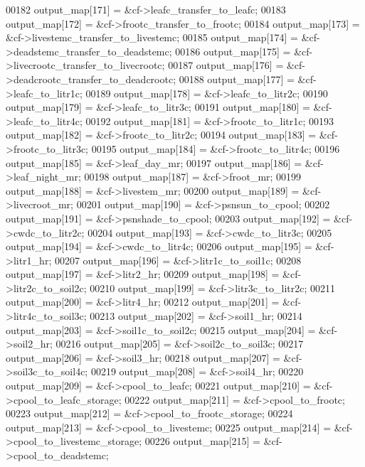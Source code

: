 \begin{DoxyCode}
00182         output\_map[171] = &cf->leafc\_transfer\_to\_leafc;
00183         output\_map[172] = &cf->frootc\_transfer\_to\_frootc;
00184         output\_map[173] = &cf->livestemc\_transfer\_to\_livestemc;
00185         output\_map[174] = &cf->deadstemc\_transfer\_to\_deadstemc;
00186         output\_map[175] = &cf->livecrootc\_transfer\_to\_livecrootc;
00187         output\_map[176] = &cf->deadcrootc\_transfer\_to\_deadcrootc;
00188         output\_map[177] = &cf->leafc\_to\_litr1c;
00189         output\_map[178] = &cf->leafc\_to\_litr2c;
00190         output\_map[179] = &cf->leafc\_to\_litr3c;
00191         output\_map[180] = &cf->leafc\_to\_litr4c;
00192         output\_map[181] = &cf->frootc\_to\_litr1c;
00193         output\_map[182] = &cf->frootc\_to\_litr2c;
00194         output\_map[183] = &cf->frootc\_to\_litr3c;
00195         output\_map[184] = &cf->frootc\_to\_litr4c;
00196         output\_map[185] = &cf->leaf\_day\_mr;
00197         output\_map[186] = &cf->leaf\_night\_mr;
00198         output\_map[187] = &cf->froot\_mr;
00199         output\_map[188] = &cf->livestem\_mr;
00200         output\_map[189] = &cf->livecroot\_mr;
00201         output\_map[190] = &cf->psnsun\_to\_cpool;
00202         output\_map[191] = &cf->psnshade\_to\_cpool;
00203         output\_map[192] = &cf->cwdc\_to\_litr2c;
00204         output\_map[193] = &cf->cwdc\_to\_litr3c;
00205         output\_map[194] = &cf->cwdc\_to\_litr4c;
00206         output\_map[195] = &cf->litr1\_hr;
00207         output\_map[196] = &cf->litr1c\_to\_soil1c;
00208         output\_map[197] = &cf->litr2\_hr;
00209         output\_map[198] = &cf->litr2c\_to\_soil2c;
00210         output\_map[199] = &cf->litr3c\_to\_litr2c;
00211         output\_map[200] = &cf->litr4\_hr;
00212         output\_map[201] = &cf->litr4c\_to\_soil3c;
00213         output\_map[202] = &cf->soil1\_hr;
00214         output\_map[203] = &cf->soil1c\_to\_soil2c;
00215         output\_map[204] = &cf->soil2\_hr;
00216         output\_map[205] = &cf->soil2c\_to\_soil3c;
00217         output\_map[206] = &cf->soil3\_hr;
00218         output\_map[207] = &cf->soil3c\_to\_soil4c;
00219         output\_map[208] = &cf->soil4\_hr;
00220         output\_map[209] = &cf->cpool\_to\_leafc;
00221         output\_map[210] = &cf->cpool\_to\_leafc\_storage;
00222         output\_map[211] = &cf->cpool\_to\_frootc;
00223         output\_map[212] = &cf->cpool\_to\_frootc\_storage;
00224         output\_map[213] = &cf->cpool\_to\_livestemc;
00225         output\_map[214] = &cf->cpool\_to\_livestemc\_storage;
00226         output\_map[215] = &cf->cpool\_to\_deadstemc;

\end{DoxyCode}
